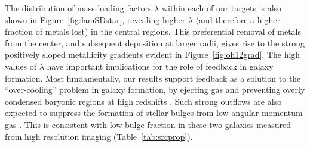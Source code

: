 The distribution of mass loading factors $\lambda$ within each of our targets is also shown in 
Figure~\ref{fig:lamSDstar}, revealing higher $\lambda$ (and therefore a higher fraction of metals lost) in the central regions.
This preferential removal of metals from the center, and subsequent deposition at larger radii, gives rise to the strong 
positively sloped metallicity gradients evident in Figure~\ref{fig:oh12grad}.
The high values of $\lambda$ have important implications for the role of feedback in galaxy formation.
Most fundamentally, our results support feedback as a solution to the ``over-cooling'' problem in galaxy formation, by ejecting
gas and preventing overly condensed baryonic regions at high redshifts \citep{1978MNRAS.183..341W,Dekel:1986cv}.
Such strong outflows are also expected to suppress the formation of stellar bulges from low angular momentum gas 
\citep{Governato:2010ed,Brook:2012gj}.
This is consistent with low bulge fraction in these two galaxies measured from high resolution \hst imaging 
(Table~\ref{tab:srcprop}).

